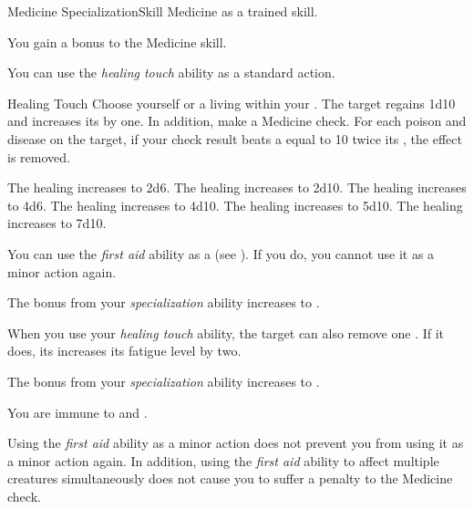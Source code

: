     \begin{feat}{Medicine Specialization}{Skill}
        \featpre Medicine as a trained skill.

         You gain a  bonus to the Medicine skill.

         You can use the \textit{healing touch} ability as a standard action.
        \begin{instantability}{Healing Touch}
            \rankline
            Choose yourself or a living  within your .
            The target regains 1d10 \add {}  and increases its  by one.
            In addition, make a Medicine check.
            For each poison and disease on the target, if your check result beats a  equal to 10 \add twice its , the effect is removed.

            \rankline
             The healing increases to 2d6.
             The healing increases to 2d10.
             The healing increases to 4d6.
             The healing increases to 4d10.
             The healing increases to 5d10.
             The healing increases to 7d10.
        \end{instantability}

         You can use the \textit{first aid} ability as a  (see ).
        If you do, you  cannot use it as a minor action again.

         The bonus from your \textit{specialization} ability increases to .

         When you use your \textit{healing touch} ability, the target can also remove one .
        If it does, its increases its fatigue level by two.

         The bonus from your \textit{specialization} ability increases to .

         You are immune to  and .

         Using the \textit{first aid} ability as a minor action does not prevent you from using it as a minor action again.
        In addition, using the \textit{first aid} ability to affect multiple creatures simultaneously does not cause you to suffer a penalty to the Medicine check.
    \end{feat}


